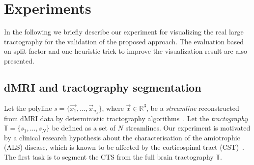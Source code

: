 \vspace{-10mm}
\section{Experiments}\vspace{-2mm}
\label{sec:experiments}
In the following we briefly describe our experiment for visualizing the real large tractography for the validation of the proposed approach. The evaluation based on split factor and one heuristic trick to improve the visualization result are also presented.

\vspace{-2mm}
\subsection{dMRI and tractography segmentation}\vspace{-1mm}
Let the polyline $s =\{ \vec{x_1},\ldots,\vec{x}_{n_s}\}$, where $\vec{x} \in \mathbb{R}^3$, be a \emph{streamline} reconstructed from dMRI data by deterministic tractography algorithms~\cite{mori2002fiber}. 
Let the \emph{tractography} $ \mathbb{T}  = \{s_1,\ldots,s_N\}$ be defined as a set of $N$ streamlines. %
Our experiment is motivated by a clinical research hypothesis about the characterisation of the amiotrophic (ALS) disease, which is known to be affected by the corticospinal tract (CST)~\cite{cosottini2010evaluation,sage2009quantitative}. The first task is to segment the CTS from the full brain tractography $\mathbb{T}$. 

